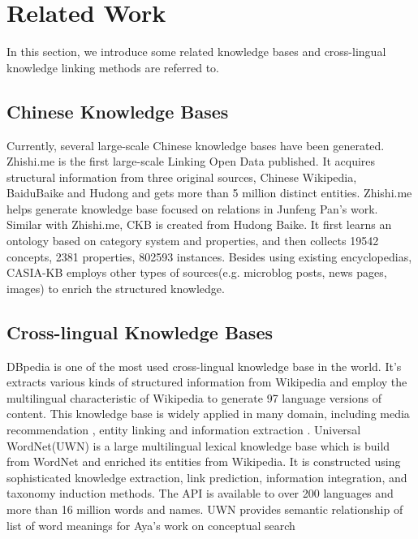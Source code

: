 \documentclass[runningheads,a4paper]{llncs}
\begin{document}
\section{Related Work}
\label{sec:work}
In this section, we introduce some related knowledge bases and cross-lingual knowledge linking methods are referred to.
\subsection{Chinese Knowledge Bases}
Currently, several large-scale Chinese knowledge bases have been generated. Zhishi.me\cite{niu2011zhishi,wang2014publishing} is the first large-scale Linking Open Data published. It acquires structural information from three original sources, Chinese Wikipedia, BaiduBaike and Hudong and gets more than 5 million distinct entities. Zhishi.me helps generate knowledge base focused on relations in Junfeng Pan’s work\cite{pan2012building}.
Similar with Zhishi.me, CKB\cite{wang2012building} is created from Hudong Baike. It first learns an ontology based on category system and properties, and then collects 19542 concepts, 2381 properties, 802593 instances. Besides using existing encyclopedias, CASIA-KB employs other types of sources(e.g. microblog posts, news pages, images) to enrich the structured knowledge.
\subsection{Cross-lingual Knowledge Bases}
DBpedia \cite{auer2007dbpedia,mendes2012dbpedia} is one of the most used cross-lingual knowledge base in the world. It's extracts various kinds of structured information from Wikipedia and employ the multilingual characteristic of Wikipedia to generate 97 language versions of content. This knowledge base is widely applied in many domain, including media recommendation \cite{passant2010dbrec,fernandez2011generic,kaminskas2012knowledge}, entity linking\cite{mendes2011evaluating} and information extraction \cite{dutta2013integrating}.
Universal WordNet(UWN)\cite{de2012uwn} is a large multilingual lexical knowledge base which is build from WordNet and enriched its entities from Wikipedia. It is constructed using sophisticated knowledge extraction, link prediction, information integration, and taxonomy induction methods. The API is available to over 200 languages and more than 16 million words and names. UWN provides semantic relationship of list of word meanings for Aya's work on conceptual search \cite{al2015conceptual}
\end{document}
